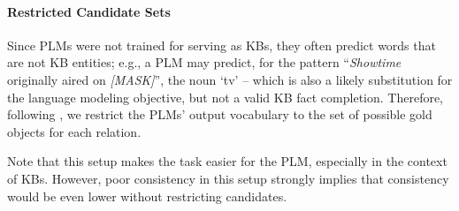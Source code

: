 \paragraph{Restricted Candidate Sets}

Since PLMs were not trained for
serving as KBs,
they often predict words
that are not KB entities;
e.g., a PLM may predict, for the pattern ``\textit{Showtime} originally aired on \textit{[MASK]}'', the noun
`tv' --  which is also a likely substitution for the language
modeling objective, but not a valid KB fact completion.
Therefore,
following \citep{Xiong2020Pretrained, kassner2021multilingual},
we
restrict the PLMs' output vocabulary to the set of possible gold objects for each
relation.


Note that this setup makes the task easier for the PLM,
especially in the context of KBs. However, poor
consistency in this setup strongly implies that consistency
would be even lower without restricting candidates.
